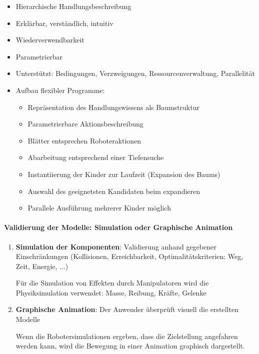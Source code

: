 \begin{itemize}
\item Hierarchische Handlungsbeschreibung
\item Erklärbar, verständlich, intuitiv
\item Wiederverwendbarkeit
\item Parametrierbar
\item Unterstützt: Bedingungen, Verzweigungen, Ressourcenverwaltung, Parallelität
\item Aufbau flexibler Programme:
\begin{itemize}
\item Repräsentation des Handlungswissens als Baumstruktur
\item Parametrierbare Aktionsbeschreibung
\item Blätter entsprechen Roboteraktionen
\item Abarbeitung entsprechend einer Tiefensuche
\item Instantiierung der Kinder zur Laufzeit (Expansion des Baums)
\item Auswahl des geeignetsten Kandidaten beim expandieren
\item Parallele Ausführung mehrerer Kinder möglich
\end{itemize}
\end{itemize}
\paragraph*{Validierung der Modelle: Simulation oder Graphische Animation}
\begin{enumerate}
\item \textbf{Simulation der Komponenten}: Validierung anhand gegebener Einschränkungen (Kollisionen, Erreichbarkeit, Optimalitätskriterien: Weg, Zeit, Energie, ...)
\begin{itemize}
\ita Für die Simulation von Effekten durch Manipulatoren wird die Physiksimulation verwendet: Masse, Reibung, Kräfte, Gelenke
\end{itemize}
\item \textbf{Graphische Animation}: Der Anwender überprüft visuell die erstellten Modelle
\begin{itemize}
\ita Wenn die Robotersimulationen ergeben, dass die Zielstellung angefahren werden kann, wird die Bewegung in einer Animation graphisch dargestellt.
\end{itemize}
\end{enumerate}

